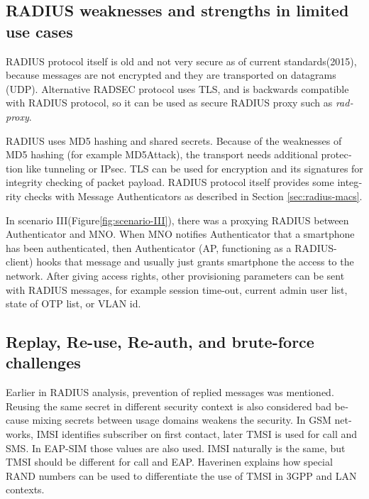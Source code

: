 \documentclass[12pt,a4paper,english]{tutthesis}
\begin{document}
\begin{otherlanguage}{english}
\subsection{RADIUS weaknesses and strengths in limited use cases}
\label{sec-6-4-4}


RADIUS protocol itself is old and not very secure as of current
standards(2015), because messages are not encrypted and they are
transported on datagrams (UDP). Alternative RADSEC protocol uses TLS, and 
is backwards compatible with RADIUS protocol, so it can be used
as secure RADIUS proxy such as \emph{radproxy}\cite{uninett-radproxy}.

RADIUS uses MD5 hashing and shared secrets. Because of the weaknesses of
MD5 hashing (for example MD5Attack\cite{rfc5176}), the transport needs additional
protection like tunneling or IPsec. TLS can be used for encryption and
its signatures for integrity checking of packet payload.
RADIUS protocol itself provides some integrity checks with Message
Authenticators as described in Section \ref{sec:radius-macs}.



In scenario III(Figure\ref{fig:scenario-III}),  there was a proxying RADIUS between Authenticator
and MNO.  When MNO notifies Authenticator
that a smartphone has been authenticated, then Authenticator (AP, functioning
as a RADIUS-client) hooks that message and usually just grants
smartphone the access to the network. After giving access rights, other
provisioning parameters can be sent with RADIUS messages, for example
session time-out,
current admin user list, state of OTP list, or VLAN id.


\subsection{Replay, Re-use, Re-auth, and brute-force challenges}
\label{sec-6-4-5}

Earlier in RADIUS analysis, prevention of replied messages was
mentioned. Reusing the same secret in different security context is also
considered bad because mixing secrets between usage
domains weakens the security.  In GSM networks, IMSI identifies subscriber on
first contact, later TMSI is used for call and SMS.  In EAP-SIM those
values are also used. IMSI naturally is the same, but TMSI should be
different for call and EAP.  Haverinen\cite{hav-doc} explains how
special RAND numbers can be used to differentiate the use of TMSI in 3GPP and LAN
contexts.


\end{otherlanguage}
\end{document}

